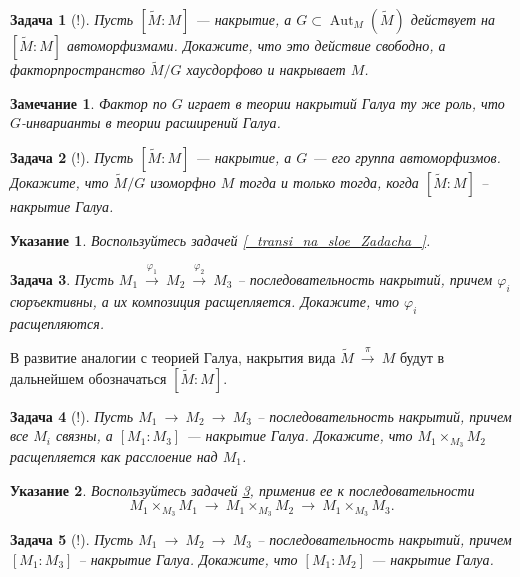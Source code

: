 \documentclass[12pt]{book}
\newcommand{\arrow}{{\:\longrightarrow\:}}
\renewcommand{\phi}{\varphi}
\def\Aut{\operatorname{Aut}}
\theoremstyle{upshape}
\newtheorem{zadacha}{Задача}[chapter]
\theoremstyle{generic}
\theoremstyle{upshapenonumber}
\newtheorem{ukazanie}{Указание}[section]
\newtheorem{zamechanie}{Замечание}[chapter]
\newcommand{\следствие}{%
     \refstepcounter{teorema}
     {\noindent\bf Следствие \thechapter.\arabic{teorema}:\ }}
\newcommand{\пример}{%
     \refstepcounter{teorema}
     {\noindent\bf Пример \thechapter.\arabic{teorema}:\ }}
\newcommand{\лемма}{%
     \refstepcounter{teorema}
     {\noindent\bf Лемма \thechapter.\arabic{teorema}:\ }}
\newcommand{\теорема}{%
     \refstepcounter{teorema}
     {\noindent\bf Теорема \thechapter.\arabic{teorema}:\ }}
\newcommand{\утверждение}{%
     \refstepcounter{teorema}
     {\noindent\bf Утверждение \thechapter.\arabic{teorema}:\ }}
\begin{document}
{\begin{zadacha}[!]
Пусть $[\tilde M:M]$ --- накрытие, а $G\subset \Aut_M(\tilde M)$ 
действует на $[\tilde M:M]$ автоморфизмами. Докажите, что
это действие свободно, а факторпространство $\tilde M/G$
хаусдорфово и накрывает $M$.
\end{zadacha}

\begin{zamechanie}
Фактор по $G$ играет в теории накрытий Галуа 
ту же роль, что $G$-инварианты в теории расширений Галуа.
\end{zamechanie}

\begin{zadacha}[!]
Пусть $[\tilde M:M]$ --- накрытие,
а $G$ --- его группа автоморфизмов. Докажите, что $\tilde M/G$
изоморфно $M$ тогда и только тогда, когда $[\tilde M:M]$ --
накрытие Галуа.
\end{zadacha}

\begin{ukazanie}
Воспользуйтесь задачей \ref{_transi_na_sloe_Zadacha_}.
\end{ukazanie}

\begin{zadacha}\label{_kompo_rasshe_Zadacha_}
Пусть $M_1\stackrel{\phi_1}\arrow M_2 \stackrel{\phi_2}\arrow M_3$
-- последовательность накрытий, причем
$\phi_i$ сюръективны, а их композиция расщепляется.
Докажите, что $\phi_i$ расщепляются.
\end{zadacha}


В развитие аналогии с теорией Галуа, 
накрытия вида $\tilde M \stackrel \pi \arrow M$
будут в дальнейшем обозначаться $[\tilde M:M]$.


\begin{zadacha}[!]\label{_M_1_times_promezhu_Zadacha_}
Пусть $M_1\arrow M_2 \arrow M_3$ --
последовательность накрытий, причем все $M_i$ связны, а
$[M_1:M_3]$ --- накрытие Галуа. Докажите, что 
$M_1 \times_{M_3} M_2$ расщепляется как расслоение над $M_1$.
\end{zadacha}

\begin{ukazanie} 
Воспользуйтесь  задачей \ref{_kompo_rasshe_Zadacha_}, применив ее к
последовательности
\[ 
  M_1\times_{M_3}M_1\arrow M_1\times_{M_3}M_2 \arrow M_1\times_{M_3}M_3.
\]
\end{ukazanie}

\begin{zadacha}[!]
Пусть $M_1\arrow M_2 \arrow M_3$ --
последовательность накрытий, причем $[M_1:M_3]$
-- накрытие Галуа. Докажите, что
$[M_1:M_2]$ --- накрытие Галуа.
\end{zadacha}

}
\end{document}
